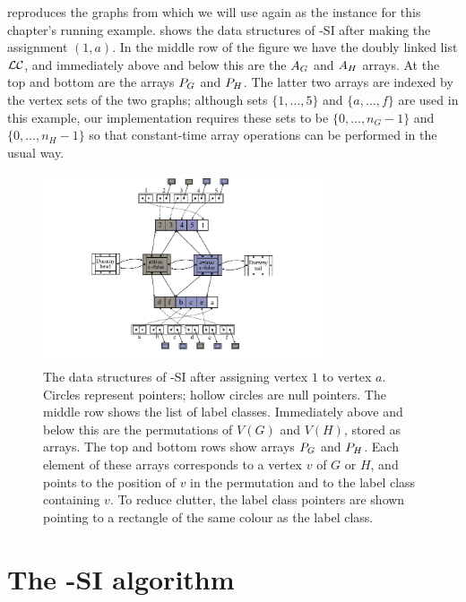  reproduces the graphs from
 which we will use again as the instance for this
chapter's running example.   shows the data
structures of \McSplit-SI after making the assignment $(1,a)$.  In the middle
row of the figure we have the doubly linked list $\mathcal{LC}$, and immediately
above and below this are the $A_G$ and $A_H$ arrays.  At the top and
bottom are the arrays $P_G$ and $P_H$.  The latter two arrays are indexed
by the vertex sets of the two graphs; although sets $\{1,\dots,5\}$ and
$\{a,\dots,f\}$ are used in this example, our implementation requires these sets to be
$\{0, \dots, n_G-1\}$ and $\{0, \dots, n_H-1\}$ so that constant-time array
operations can be performed in the usual way.


\begin{figure}[htb]
    \centering
    \includegraphics*[width=0.75\textwidth]{14b-mcsplit-induced-si/figs/data-structure-step-1}
    \caption{The data structures of \McSplit-SI after assigning vertex $1$ to vertex $a$.
        Circles represent pointers; hollow circles are null pointers.  The middle row shows
        the list of label classes.  Immediately above and below this are the
        permutations of $V(G)$ and $V(H)$, stored as arrays.  The top and bottom rows
        show arrays $P_G$ and $P_H$.  Each element of these arrays
        corresponds to a vertex $v$ of $G$ or $H$, and points to the position of $v$ in
        the permutation and to the label class containing $v$.  To reduce clutter,
        the label class pointers are shown pointing to a rectangle of the same colour as the
        label class.}
    \label{figure:si-data-structures}
\end{figure}

\FloatBarrier

\section{The \McSplit-SI algorithm}\label{sec:mcsplit-si-algorithm}

